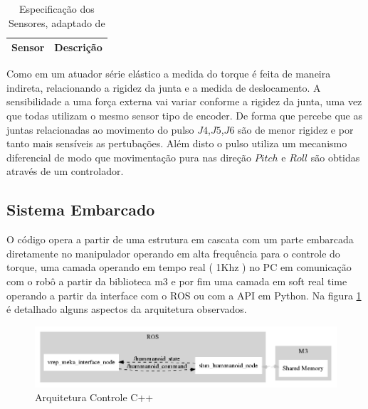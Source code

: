 
\begin{table}[H]
    \centering
    \begin{tabular}{ll}
         \hline
         Sensor & Descrição\\
         \hline
         
         \hline
    \end{tabular}
    \caption{Especificação dos Sensores, adaptado de \cite{nobody}}
    \label{tab:a2armSensorDoc}
\end{table}

Como em um atuador série elástico a medida do torque é feita de maneira indireta, relacionando a rigidez da junta e a medida de deslocamento. A sensibilidade a uma força externa vai variar conforme a rigidez da junta, uma vez que todas utilizam o mesmo sensor tipo de encoder. De forma que percebe que as juntas relacionadas ao movimento do pulso $J4$,$J5$,$J6$ são de menor rigidez e por tanto mais sensíveis as pertubações. Além disto o pulso utiliza um mecanismo diferencial\cite{nobody} de modo que movimentação pura nas direção $Pitch$ e $Roll$ são obtidas através de um controlador.

\subsection{Sistema Embarcado}


O código opera a partir de uma estrutura em cascata com um parte embarcada diretamente no manipulador operando em alta frequência para o controle do torque, uma camada operando em tempo real ( 1Khz ) no PC em comunicação com o robô a partir da biblioteca m3 e por fim uma camada em soft real time operando a partir da interface com o ROS ou com a API em Python. Na figura \ref{fig:shm_arch} é detalhado alguns aspectos da arquitetura observados.

\begin{figure}
    \centering
    \includegraphics[width=1\linewidth]{figs/shm_arch}
    \caption{Arquitetura Controle C++}
    \label{fig:shm_arch}
\end{figure}

